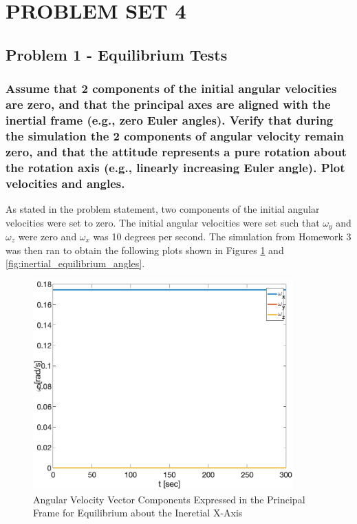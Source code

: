 \section{\Large PROBLEM SET 4}

\subsection{Problem 1 - Equilibrium Tests}

\subsubsection{Assume that 2 components of the initial angular velocities are zero, and that the principal axes are
aligned with the inertial frame (e.g., zero Euler angles). Verify that during the simulation the 2
components of angular velocity remain zero, and that the attitude represents a pure rotation about
the rotation axis (e.g., linearly increasing Euler angle). Plot velocities and angles.}

As stated in the problem statement, two components of the initial angular velocities were set to zero. The initial angular velocities were set such that $\omega_y$ and $\omega_z$ were zero and $\omega_x$ was 10 degrees per second. The simulation from Homework 3 was then ran to obtain the following plots shown in Figures \ref{fig:inertial_equilibrium_velocities} and \ref{fig:inertial_equilibrium_angles}.   

\begin{figure}[H]
    \centering
    \captionsetup{justification = centering}
    \includegraphics[width = 10cm]{Images/PS4/equilibrium_inertial_velocities.png}
    \caption{Angular Velocity Vector Components Expressed in the Principal Frame for Equilibrium about the Ineretial X-Axis}
    \label{fig:inertial_equilibrium_velocities}
\end{figure}

